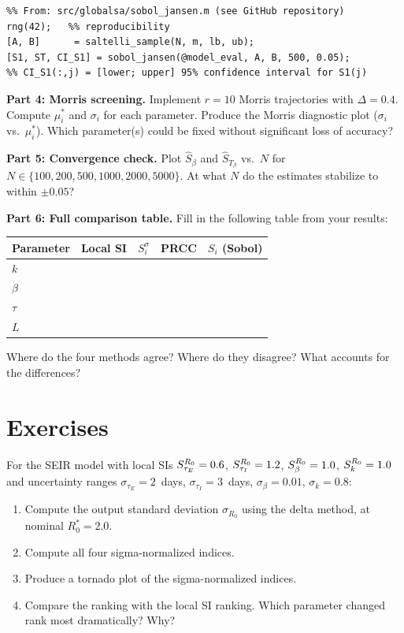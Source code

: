 \begin{verbatim}
%% From: src/globalsa/sobol_jansen.m (see GitHub repository)
rng(42);   %% reproducibility
[A, B]      = saltelli_sample(N, m, lb, ub);
[S1, ST, CI_S1] = sobol_jansen(@model_eval, A, B, 500, 0.05);
%% CI_S1(:,j) = [lower; upper] 95% confidence interval for S1(j)
\end{verbatim}

\textbf{Part 4: Morris screening.}
Implement $r = 10$ Morris trajectories with $\Delta = 0.4$.
Compute $\mu_i^*$ and $\sigma_i$ for each parameter.
Produce the Morris diagnostic plot ($\sigma_i$ vs.\ $\mu_i^*$).
Which parameter(s) could be fixed without significant loss of accuracy?

\textbf{Part 5: Convergence check.}
Plot $\hat{S}_\beta$ and $\hat{S}_{T_\beta}$ vs.\ $N$ for
$N \in \{100, 200, 500, 1000, 2000, 5000\}$.
At what $N$ do the estimates stabilize to within $\pm0.05$?

\textbf{Part 6: Full comparison table.}
Fill in the following table from your results:

\begin{center}
\begin{tabular}{lcccc}
\toprule
Parameter & Local SI & $S_i^\sigma$ & PRCC & $S_i$ (Sobol) \\
\midrule
$k$ & & & & \\
$\beta$ & & & & \\
$\tau$ & & & & \\
$L$ & & & & \\
\bottomrule
\end{tabular}
\end{center}

Where do the four methods agree? Where do they disagree? What accounts
for the differences?

\section{Exercises}

\begin{exercise}[\bloom{L3}]
\label{ex:ch9:sigmanorm}
For the SEIR model with local SIs $S_{\tau_E}^{R_0} = 0.6$,
$S_{\tau_I}^{R_0} = 1.2$, $S_{\beta}^{R_0} = 1.0$, $S_{k}^{R_0} = 1.0$
and uncertainty ranges $\sigma_{\tau_E} = 2$~days, $\sigma_{\tau_I} = 3$~days,
$\sigma_\beta = 0.01$, $\sigma_k = 0.8$:
\begin{enumerate}[label=(\alph*)]
  \item Compute the output standard deviation $\sigma_{R_0}$ using the
        delta method, at nominal $R_0^* = 2.0$.
  \item Compute all four sigma-normalized indices.
  \item Produce a tornado plot of the sigma-normalized indices.
  \item Compare the ranking with the local SI ranking. Which parameter
        changed rank most dramatically? Why?
\end{enumerate}
\end{exercise}

